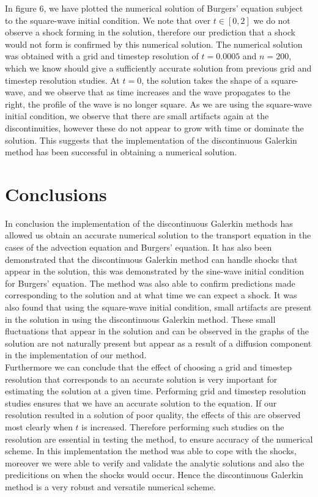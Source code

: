 \documentclass[a4paper, 12pt]{article}
\begin{document}
In figure 6, we have plotted the numerical solution of Burgers' equation subject to the square-wave initial condition. We note that over $t\in[0,2]$ we do not observe a shock forming in the solution, therefore our prediction that a shock would not form is confirmed by this numerical solution. The numerical solution was obtained with a grid and timestep resolution of $t=0.0005$ and $n=200$, which we know should give a sufficiently accurate solution from previous grid and timestep resolution studies. At $t=0$, the solution takes the shape of a square-wave, and we observe that as time increases and the wave propagates to the right, the profile of the wave is no longer square. As we are using the square-wave initial condition, we observe that there are small artifacts again at the discontinuities, however these do not appear to grow with time or dominate the solution. This suggests that the implementation of the discontinuous Galerkin method has been successful in obtaining a numerical solution.\\

  
%
  
  
\newpage
\section{Conclusions}
In conclusion the implementation of the discontinuous Galerkin methods has allowed us obtain an accurate numerical solution to the transport equation in the cases of the advection equation and Burgers' equation. It has also been demonstrated that the discontinuous Galerkin method can handle shocks that appear in the solution, this was demonstrated by the sine-wave initial condition for Burgers' equation. The method was also able to confirm predictions made corresponding to the solution and at what time we can expect a shock. It was also found that using the square-wave initial condition, small artifacts are present in the solution in using the discontinuous Galerkin method. These small fluctuations that appear in the solution and can be observed in the graphs of the solution are not naturally present but appear as a result of a diffusion component in the implementation of our method.\\

Furthermore we can conclude that the effect of choosing a grid and timestep resolution that corresponds to an accurate solution is very important for estimating the solution at a given time. Performing grid and timestep resolution studies ensures that we have an accurate solution to the equation. If our resolution resulted in a solution of poor quality, the effects of this are observed most clearly when $t$ is increased. Therefore performing such studies on the resolution are essential in testing the method, to ensure accuracy of the numerical scheme. In this implementation the method was able to cope with the shocks, moreover we were able to verify and validate the analytic solutions and also the predicitions on when the shocks would occur. Hence the discontinuous Galerkin method is a very robust and versatile numerical scheme.\\
\end{document}
